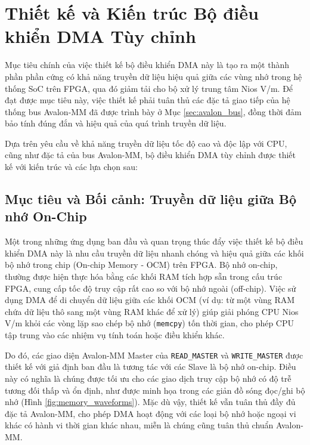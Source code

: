 \section{Thiết kế và Kiến trúc Bộ điều khiển DMA Tùy chỉnh}
\label{sec:dma_design_and_architecture} %
Mục tiêu chính của việc thiết kế bộ điều khiển DMA này là tạo ra một thành phần phần cứng có khả năng truyền dữ liệu hiệu quả giữa các vùng nhớ trong hệ thống SoC trên FPGA, qua đó giảm tải cho bộ xử lý trung tâm Nios V/m. Để đạt được mục tiêu này, việc thiết kế phải tuân thủ các đặc tả giao tiếp của hệ thống bus Avalon-MM đã được trình bày ở Mục \ref{sec:avalon_bus}, đồng thời đảm bảo tính đúng đắn và hiệu quả của quá trình truyền dữ liệu.

Dựa trên yêu cầu về khả năng truyền dữ liệu tốc độ cao và độc lập với CPU, cũng như đặc tả của bus Avalon-MM, bộ điều khiển DMA tùy chỉnh được thiết kế với kiến trúc và các lựa chọn sau:

\subsection{Mục tiêu và Bối cảnh: Truyền dữ liệu giữa Bộ nhớ On-Chip}
\label{subsec:dma_context_onchip}
Một trong những ứng dụng ban đầu và quan trọng thúc đẩy việc thiết kế bộ điều khiển DMA này là nhu cầu truyền dữ liệu nhanh chóng và hiệu quả giữa các khối bộ nhớ trong chip (On-chip Memory - OCM) trên FPGA. Bộ nhớ on-chip, thường được hiện thực hóa bằng các khối RAM tích hợp sẵn trong cấu trúc FPGA, cung cấp tốc độ truy cập rất cao so với bộ nhớ ngoài (off-chip). Việc sử dụng DMA để di chuyển dữ liệu giữa các khối OCM (ví dụ: từ một vùng RAM chứa dữ liệu thô sang một vùng RAM khác để xử lý) giúp giải phóng CPU Nios V/m khỏi các vòng lặp sao chép bộ nhớ (\texttt{memcpy}) tốn thời gian, cho phép CPU tập trung vào các nhiệm vụ tính toán hoặc điều khiển khác.

Do đó, các giao diện Avalon-MM Master của \texttt{READ\_MASTER} và \texttt{WRITE\_MASTER} được thiết kế với giả định ban đầu là tương tác với các Slave là bộ nhớ on-chip. Điều này có nghĩa là chúng được tối ưu cho các giao dịch truy cập bộ nhớ có độ trễ tương đối thấp và ổn định, như được minh họa trong các giản đồ sóng đọc/ghi bộ nhớ (Hình \ref{fig:memory_waveforms}). Mặc dù vậy, thiết kế vẫn tuân thủ đầy đủ đặc tả Avalon-MM, cho phép DMA hoạt động với các loại bộ nhớ hoặc ngoại vi khác có hành vi thời gian khác nhau, miễn là chúng cũng tuân thủ chuẩn Avalon-MM.


